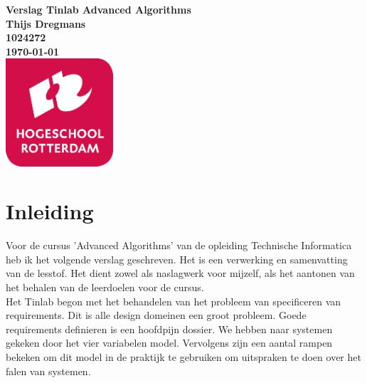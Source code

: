 \documentclass{article}
\begin{document}
	\sffamily
	
	\begin{titlepage}
	
		\centering
		  \vfill
		  {\bfseries\Huge
		    Verslag Tinlab Advanced Algorithms \\
		      \vskip2cm
		    }
		    {\bfseries\Large
		      Thijs Dregmans\\
		    }
		    {
		      \bfseries\normalsize
		      1024272\\
		      \vskip1cm
		      \today\\
		  }    
		  \vfill
		  \includegraphics[width=4cm]{logohr.png} %
		  \vfill
		  \vfill
	    
	\end{titlepage}
	
	\newpage
	
	
	\tableofcontents
	
	\newpage
	
	
	\section{Inleiding}
	
	Voor de cursus 'Advanced Algorithms' van de opleiding Technische Informatica heb ik het volgende verslag geschreven. Het is een verwerking en samenvatting van de lesstof. Het dient zowel als naslagwerk voor mijzelf, als het aantonen van het behalen van de leerdoelen voor de cursus. \\
	
Het Tinlab begon met het behandelen van het probleem van specificeren van requirements. Dit is alle design domeinen een groot probleem. Goede requirements definieren is een hoofdpijn dossier. We hebben naar systemen gekeken door het vier variabelen model. Vervolgens zijn een aantal rampen bekeken om dit model in de praktijk te gebruiken om uitspraken te doen over het falen van systemen.  \\
\end{document}
